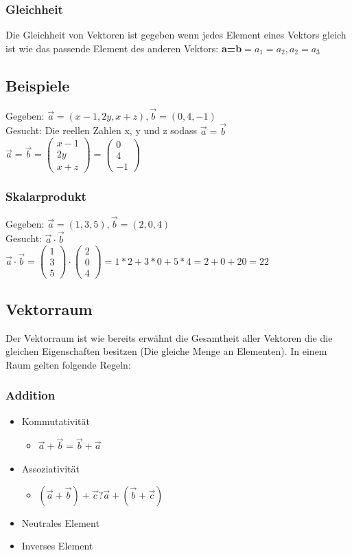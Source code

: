 \documentclass{article}
\begin{document}
	\subsubsection{Gleichheit}
	Die Gleichheit von Vektoren ist gegeben wenn jedes Element eines Vektors gleich ist wie das passende Element des anderen Vektors: \textbf{a=b}$=a_1=a_2, a_2=a_3$
	\subsection{Beispiele}
	Gegeben: $\vec{a}=(x-1,2y,x+z), \vec{b}=(0,4,-1)$ \\
	Gesucht: Die reellen Zahlen x, y und z sodass $\vec{a}=\vec{b}$ \\
	$\vec{a}=\vec{b}=\begin{pmatrix} x-1 \\ 2y  \\ x+z \end{pmatrix}=\begin{pmatrix} 0 \\ 4 \\ -1  \end{pmatrix}$
	\subsubsection{Skalarprodukt}
	Gegeben: $\vec{a}=(1,3,5), \vec{b}=(2,0,4)$ \\
	Gesucht: $\vec{a}\cdot\vec{b}$ \\
	$\vec{a}\cdot\vec{b}=\begin{pmatrix} 1 \\ 3 \\ 5 \end{pmatrix}\cdot \begin{pmatrix} 2 \\ 0 \\ 4 \end{pmatrix}=1*2+3*0+5*4=2+0+20=22$
	\subsection{Vektorraum}
	Der Vektorraum ist wie bereits erwähnt die Gesamtheit aller Vektoren die die gleichen Eigenschaften besitzen (Die gleiche Menge an Elementen). In einem Raum gelten folgende Regeln:
	\subsubsection{Addition}
	\begin{itemize}
		\item{Kommutativität}
		\begin{itemize}
			\item{$\vec{a}+\vec{b}=\vec{b}+\vec{a}$}
		\end{itemize}
		\item{Assoziativität}
		\begin{itemize}
			\item{$(\vec{a}+\vec{b})+\vec{c}?\vec{a}+(\vec{b}+\vec{c})$}
		\end{itemize}
		\item{Neutrales Element}
		\item{Inverses Element}
	\end{itemize}
\end{document}
